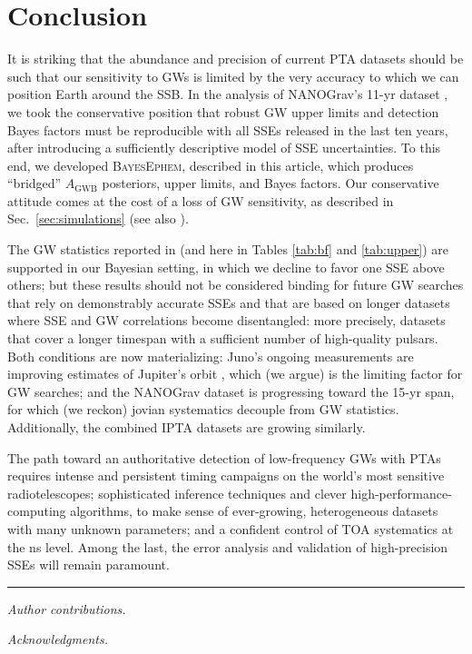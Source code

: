 \documentclass[iop,apj,twocolappendix]{emulateapj}
\begin{document}
\section{Conclusion}
\label{sec:conclusion}

It is striking that the abundance and precision of current PTA datasets should be such that our sensitivity to GWs is limited by the very accuracy to which we can position Earth around the SSB.
In the analysis of NANOGrav's 11-yr dataset \citep{2018ApJ...859...47A}, we took the conservative position that robust GW upper limits and detection Bayes factors must be reproducible with all SSEs released in the last ten years, after introducing a sufficiently descriptive model of SSE uncertainties.
To this end, we developed \textsc{BayesEphem}, described in this article, which produces ``bridged'' $A_\mathrm{GWB}$ posteriors, upper limits, and Bayes factors.
Our conservative attitude comes at the cost of a loss of GW sensitivity, as described in Sec.\ \ref{sec:simulations} (see also \citealt{2019ApJ...876...55R}).

The GW statistics reported in \cite{2018ApJ...859...47A} (and here in Tables \ref{tab:bf} and \ref{tab:upper}) are supported in our Bayesian setting, in which we decline to favor one SSE above others; but these results should not be considered binding for future GW searches that rely on demonstrably accurate SSEs and that are based on longer datasets where SSE and GW correlations become disentangled:
more precisely, datasets that cover a longer timespan with a sufficient number of high-quality pulsars.
Both conditions are now materializing: Juno's ongoing measurements are improving estimates of Jupiter's orbit \citep{de438}, which (we argue) is the limiting factor for GW searches; and the NANOGrav dataset is progressing toward the 15-yr span, for which (we reckon) jovian systematics decouple from GW statistics.
Additionally, the combined IPTA datasets \citep{2019MNRAS.490.4666P} are growing similarly.

The path toward an authoritative detection of low-frequency GWs with PTAs requires intense and persistent timing campaigns on the world's most sensitive radiotelescopes; 
sophisticated inference techniques and clever high-performance-computing algorithms, to make sense of ever-growing, heterogeneous datasets with many unknown parameters; and a confident control of TOA systematics at the ns level. Among the last, the error analysis and validation of high-precision SSEs will remain paramount.

\begin{center}
\rule{0.25\columnwidth}{.4pt}
\end{center}

\emph{Author contributions.} 

\emph{Acknowledgments.} 



\end{document}
